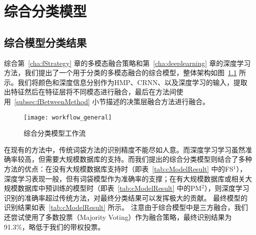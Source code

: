 
\chapter{综合分类模型}
\label{cha:comprehensiveModal}

\section{综合模型分类结果}
\label{sec:comprehensiveModalResult}

综合第~\ref{cha:fStrategy} 章的多模态融合策略和第~\ref{cha:deeplearning} 章的深度学习方法，我们提出了一个用于分类的多模态融合的综合模型，整体架构如图~\ref{fig:workflow_general} 所示。我们将颜色和深度信息分别作为HMP、CRNN、以及深度学习的输入，提取出特征然后在特征层将不同模态进行融合，最后在方法间使用~\ref{subsec:fBetweenMethod} 小节描述的决策层融合方法进行融合。


\begin{figure}[H] %
  \centering
  \texttt{[image: workflow\_general]}
  \caption{综合分类模型工作流}
  \label{fig:workflow_general}
\end{figure}

在现有的方法中，传统词袋方法的识别精度不能尽如人意。而深度学习学习虽然准确率较高，但需要大规模数据库的支持。而我们提出的综合分类模型则结合了多种方法的优点：在没有大规模数据库支持时（即表~\ref{tab:cModelResult} 中的FS$^{1}$），深度学习表现一般，但有词袋模型作为准确率的支撑；在有大规模数据库或相关大规模数据库中预训练的模型时（即表~\ref{tab:cModelResult} 中的PM$^{2}$），则深度学习识别的准确率超过传统方法，对最终分类结果可以发挥极大的贡献。
最终模型的识别结果如表~\ref{tab:cModelResult} 所示。
注意由于综合模型中是三方融合，我们还尝试使用了多数投票（Majority Voting）作为融合策略，最终识别结果为91.3\%，略低于我们的带权投票。

